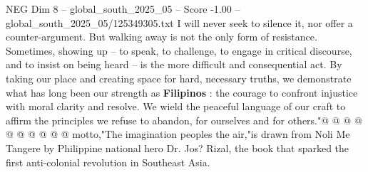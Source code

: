 \begin{textsample}{NEG Dim 8 – global\_south\_2025\_05 – Score -1.00 – global\_south\_2025\_05/125349305.txt}
I will never seek to silence it, nor offer a counter-argument.
But walking away is not the only form of resistance.
Sometimes, showing up -- to speak, to challenge, to engage in critical discourse, and to insist on being heard -- is the more difficult and consequential act.
By taking our place and creating space for hard, necessary truths, we demonstrate what has long been our strength as \textbf{Filipinos} : the courage to confront injustice with moral clarity and resolve.
We wield the peaceful language of our craft to affirm the principles we refuse to abandon, for ourselves and for others."@ @ @ @ @ @ @ @ @ @ motto,"The imagination peoples the air,"is drawn from Noli Me Tangere by Philippine national hero Dr.
Jos?
Rizal, the book that sparked the first anti-colonial revolution in Southeast Asia.

\end{textsample}
